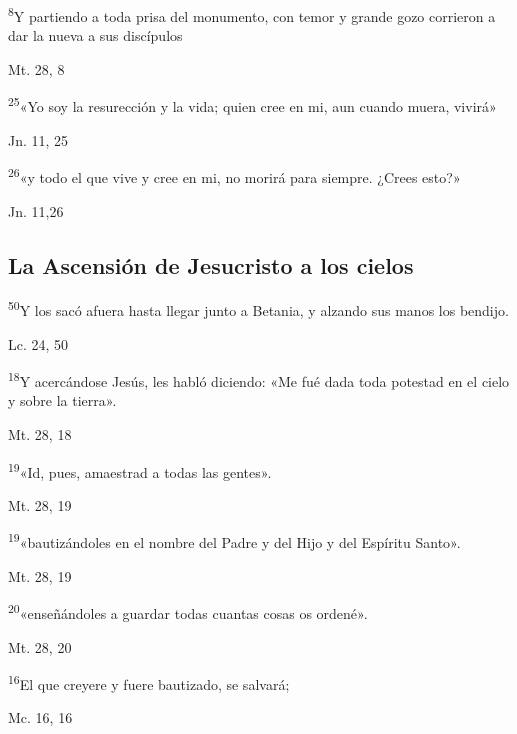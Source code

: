 \documentclass[a4paper,11pt]{article}
\begin{document}
      \textsuperscript{8}Y partiendo a toda prisa del monumento, con temor y grande gozo corrieron a dar la nueva a sus discípulos
      \begin{flushright}
        Mt. 28, 8       
      \end{flushright}      
      \textsuperscript{25}«Yo soy la resurección y la vida; quien cree en mi, aun cuando muera, vivirá»
      \begin{flushright}
        Jn. 11, 25    
      \end{flushright}      
      \textsuperscript{26}«y todo el que vive y cree en mi, no morirá para siempre. ¿Crees esto?»
      \begin{flushright}
        Jn. 11,26     
      \end{flushright}
    \subsection*{\hfil La Ascensión de Jesucristo a los cielos \hfil}
      \textsuperscript{50}Y los sacó afuera hasta llegar junto a Betania, y alzando sus manos los bendijo.
      \begin{flushright}
        Lc. 24, 50     
      \end{flushright}      
      \textsuperscript{18}Y acercándose Jesús, les habló diciendo: «Me fué dada toda potestad en el cielo y sobre la tierra».
      \begin{flushright}
        Mt. 28, 18      
      \end{flushright}      
      \textsuperscript{19}«Id, pues, amaestrad a todas las gentes».
      \begin{flushright}
        Mt. 28, 19
      \end{flushright}      
      \textsuperscript{19}«bautizándoles en el nombre del Padre y del Hijo y del Espíritu Santo».
      \begin{flushright}
        Mt. 28, 19      
      \end{flushright}      
      \textsuperscript{20}«enseñándoles a guardar todas cuantas cosas os ordené».
      \begin{flushright}
        Mt. 28, 20  
      \end{flushright}      
      \textsuperscript{16}El que creyere y fuere bautizado, se salvará;
      \begin{flushright}
        Mc. 16, 16
      \end{flushright}      
\end{document}
